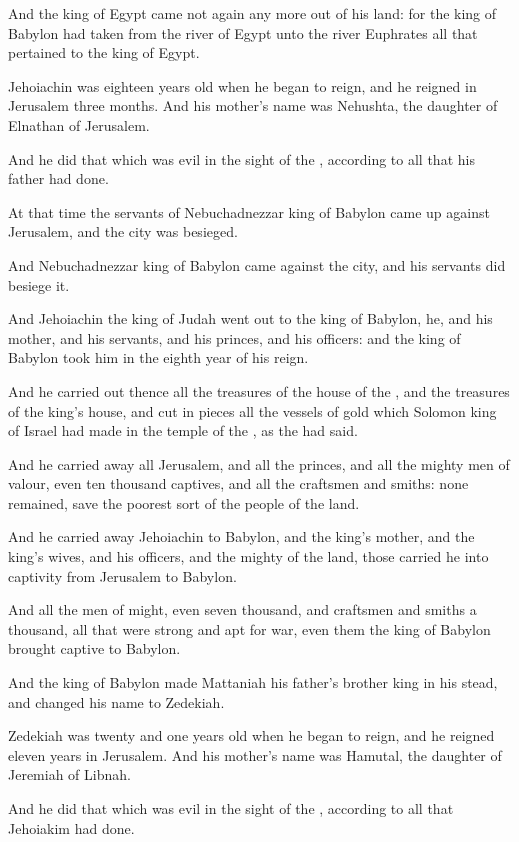 \verse And the king of Egypt came not again any more out of his land: for the king of Babylon had taken from the river of Egypt unto the river Euphrates all that pertained to the king of Egypt.

\verse Jehoiachin was eighteen years old when he began to reign, and he reigned in Jerusalem three months. And his mother's name was Nehushta, the daughter of Elnathan of Jerusalem.

\verse And he did that which was evil in the sight of the \LORD, according to all that his father had done.

\verse At that time the servants of Nebuchadnezzar king of Babylon came up against Jerusalem, and the city was besieged.

\verse And Nebuchadnezzar king of Babylon came against the city, and his servants did besiege it.

\verse And Jehoiachin the king of Judah went out to the king of Babylon, he, and his mother, and his servants, and his princes, and his officers: and the king of Babylon took him in the eighth year of his reign.

\verse And he carried out thence all the treasures of the house of the \LORD, and the treasures of the king's house, and cut in pieces all the vessels of gold which Solomon king of Israel had made in the temple of the \LORD, as the \LORD had said.

\verse And he carried away all Jerusalem, and all the princes, and all the mighty men of valour, even ten thousand captives, and all the craftsmen and smiths: none remained, save the poorest sort of the people of the land.

\verse And he carried away Jehoiachin to Babylon, and the king's mother, and the king's wives, and his officers, and the mighty of the land, those carried he into captivity from Jerusalem to Babylon.

\verse And all the men of might, even seven thousand, and craftsmen and smiths a thousand, all that were strong and apt for war, even them the king of Babylon brought captive to Babylon.

\verse And the king of Babylon made Mattaniah his father's brother king in his stead, and changed his name to Zedekiah.

\verse Zedekiah was twenty and one years old when he began to reign, and he reigned eleven years in Jerusalem. And his mother's name was Hamutal, the daughter of Jeremiah of Libnah.

\verse And he did that which was evil in the sight of the \LORD, according to all that Jehoiakim had done.

